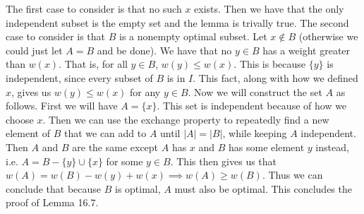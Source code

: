 \documentclass{article}
\begin{document}
\begin{description}
        The first case to consider is that no such $x$ exists. Then we have that
        the only independent subset is the empty set and the lemma is trivally
        true. The second case to consider is that $B$ is a nonempty optimal
        subset. Let $x \notin B$ (otherwise we could just let $A = B$ and be
        done). We have that no $y \in B$ has a weight greater than $w(x)$. That
        is, for all $y \in B$, $w(y) \leq w(x)$. This is because $\{y\}$ is
        independent, since every subset of $B$ is in $I$. This fact, along with
        how we defined $x$, gives us $w(y) \leq w(x)$ for any $y \in B$. Now we
        will construct the set $A$ as follows. First we will have $A = \{x\}$.
        This set is independent because of how we choose $x$. Then we can use
        the exchange property to repeatedly find a new element of $B$ that we
        can add to $A$ until $|A| = |B|$, while keeping $A$ independent. Then
        $A$ and $B$ are the same except $A$ has $x$ and $B$ has some element $y$
        instead, i.e. $A = B - \{y\} \cup \{x\}$ for some $y \in B$. This then
        gives us that $w(A) = w(B) - w(y) + w(x) \implies w(A) \ge w(B)$. Thus
        we can conclude that because $B$ is optimal, $A$ must also be optimal.
        This concludes the proof of Lemma 16.7.


\end{description}
\end{document}
